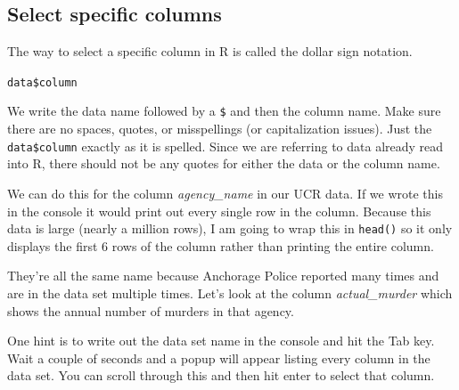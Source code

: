 \documentclass[
  12pt,
]{book}
\newenvironment{Shaded}{\begin{snugshade}}{\end{snugshade}}
\newcommand{\CommentTok}[1]{\textcolor[rgb]{0.37,0.37,0.37}{\textit{#1}}}
\newcommand{\FunctionTok}[1]{\textcolor[rgb]{0,0,0}{#1}}
\newcommand{\NormalTok}[1]{#1}
\newcommand{\SpecialCharTok}[1]{\textcolor[rgb]{0,0,0}{#1}}
\begin{document}
\hypertarget{select-specific-columns}{%
\subsection{Select specific columns}\label{select-specific-columns}}

The way to select a specific column in R is called the dollar sign notation.

\texttt{data\$column}

We write the data name followed by a \texttt{\$} and then the column name. Make sure there are no spaces, quotes, or misspellings (or capitalization issues). Just the \texttt{data\$column} exactly as it is spelled. Since we are referring to data already read into R, there should not be any quotes for either the data or the column name.

We can do this for the column \emph{agency\_name} in our UCR data. If we wrote this in the console it would print out every single row in the column. Because this data is large (nearly a million rows), I am going to wrap this in \texttt{head()} so it only displays the first 6 rows of the column rather than printing the entire column.

\begin{Shaded}
\end{Shaded}

They're all the same name because Anchorage Police reported many times and are in the data set multiple times. Let's look at the column \emph{actual\_murder} which shows the annual number of murders in that agency.

\begin{Shaded}
\end{Shaded}

One hint is to write out the data set name in the console and hit the Tab key. Wait a couple of seconds and a popup will appear listing every column in the data set. You can scroll through this and then hit enter to select that column.
\end{document}
